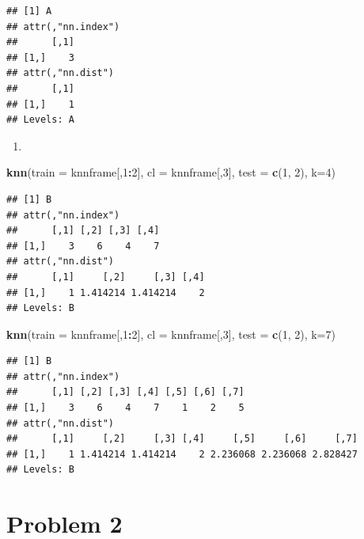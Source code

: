 \documentclass[]{article}
\newenvironment{Shaded}{\begin{snugshade}}{\end{snugshade}}
\newcommand{\KeywordTok}[1]{\textcolor[rgb]{0.13,0.29,0.53}{\textbf{#1}}}
\newcommand{\DataTypeTok}[1]{\textcolor[rgb]{0.13,0.29,0.53}{#1}}
\newcommand{\DecValTok}[1]{\textcolor[rgb]{0.00,0.00,0.81}{#1}}
\newcommand{\OperatorTok}[1]{\textcolor[rgb]{0.81,0.36,0.00}{\textbf{#1}}}
\newcommand{\NormalTok}[1]{#1}
\begin{document}
\begin{verbatim}
## [1] A
## attr(,"nn.index")
##      [,1]
## [1,]    3
## attr(,"nn.dist")
##      [,1]
## [1,]    1
## Levels: A
\end{verbatim}

\begin{enumerate}
\def\labelenumi{\alph{enumi}.}
\setcounter{enumi}{6}
\item
\end{enumerate}

\begin{Shaded}
\begin{Highlighting}[]
\KeywordTok{knn}\NormalTok{(}\DataTypeTok{train =}\NormalTok{ knnframe[,}\DecValTok{1}\OperatorTok{:}\DecValTok{2}\NormalTok{], }\DataTypeTok{cl =}\NormalTok{ knnframe[,}\DecValTok{3}\NormalTok{], }\DataTypeTok{test =} \KeywordTok{c}\NormalTok{(}\DecValTok{1}\NormalTok{, }\DecValTok{2}\NormalTok{), }\DataTypeTok{k=}\DecValTok{4}\NormalTok{)}
\end{Highlighting}
\end{Shaded}

\begin{verbatim}
## [1] B
## attr(,"nn.index")
##      [,1] [,2] [,3] [,4]
## [1,]    3    6    4    7
## attr(,"nn.dist")
##      [,1]     [,2]     [,3] [,4]
## [1,]    1 1.414214 1.414214    2
## Levels: B
\end{verbatim}

\begin{Shaded}
\begin{Highlighting}[]
\KeywordTok{knn}\NormalTok{(}\DataTypeTok{train =}\NormalTok{ knnframe[,}\DecValTok{1}\OperatorTok{:}\DecValTok{2}\NormalTok{], }\DataTypeTok{cl =}\NormalTok{ knnframe[,}\DecValTok{3}\NormalTok{], }\DataTypeTok{test =} \KeywordTok{c}\NormalTok{(}\DecValTok{1}\NormalTok{, }\DecValTok{2}\NormalTok{), }\DataTypeTok{k=}\DecValTok{7}\NormalTok{)}
\end{Highlighting}
\end{Shaded}

\begin{verbatim}
## [1] B
## attr(,"nn.index")
##      [,1] [,2] [,3] [,4] [,5] [,6] [,7]
## [1,]    3    6    4    7    1    2    5
## attr(,"nn.dist")
##      [,1]     [,2]     [,3] [,4]     [,5]     [,6]     [,7]
## [1,]    1 1.414214 1.414214    2 2.236068 2.236068 2.828427
## Levels: B
\end{verbatim}

\section{Problem 2}\label{problem-2}
\end{document}

